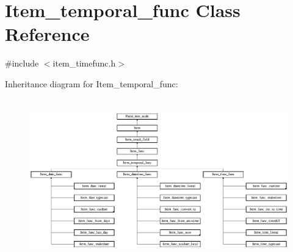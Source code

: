 \hypertarget{classItem__temporal__func}{}\section{Item\+\_\+temporal\+\_\+func Class Reference}
\label{classItem__temporal__func}


{\ttfamily \#include $<$item\+\_\+timefunc.\+h$>$}

Inheritance diagram for Item\+\_\+temporal\+\_\+func\+:\begin{figure}[H]
\begin{center}
\leavevmode
\includegraphics[height=7.088607cm]{classItem__temporal__func}
\end{center}
\end{figure}
